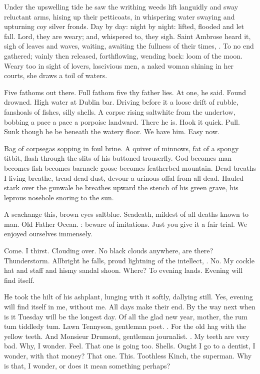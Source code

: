 Under the upswelling tide
he saw the writhing weeds lift languidly
and sway reluctant arms,
hising up their petticoats,
in whispering water swaying and upturning coy silver fronds.
Day by day:
night by night:
lifted, flooded and let fall.
Lord, they are weary;
and, whispered to, they sigh.
Saint Ambrose heard it,
sigh of leaves and waves,
waiting, awaiting the fullness of their times,
.
To no end gathered;
vainly then released, forthflowing,
wending back:
loom of the moon.
Weary too in sight of lovers,
lascivious men,
a naked woman shining in her courts,
she draws a toil of waters.

Five fathoms out there.
Full fathom five thy father lies.
At one, he said.
Found drowned.
High water at Dublin bar.
Driving before it a loose drift of rubble,
fanshoals of fishes, silly shells.
A corpse rising saltwhite from the undertow,
bobbing a pace a pace a porpoise landward.
There he is.
Hook it quick.
Pull.
Sunk though he be beneath the watery floor.
We have him.
Easy now.

Bag of corpsegas sopping in foul brine.
A quiver of minnows,
fat of a spongy titbit,
flash through the slits of his buttoned trouserfly.
God becomes man
becomes fish
becomes barnacle goose
becomes featherbed mountain.
Dead breaths I living breathe,
tread dead dust,
devour a urinous offal from all dead.
Hauled stark over the gunwale
he breathes upward the stench of his green grave,
his leprous nosehole snoring to the sun.

A seachange this, brown eyes saltblue.
Seadeath, mildest of all deaths known to man.
Old Father Ocean.
:
beware of imitations.
Just you give it a fair trial.
We enjoyed ourselves immensely.

Come.
I thirst.
Clouding over.
No black clouds anywhere, are there?
Thunderstorm.
Allbright he falls, proud lightning of the intellect,
.
No.
My cockle hat and staff and hismy sandal shoon.
Where?
To evening lands.
Evening will find itself.

He took the hilt of his ashplant,
lunging with it softly, dallying still.
Yes, evening will find itself in me,
without me.
All days make their end.
By the way next when is it Tuesday
will be the longest day.
Of all the glad new year,
mother, the rum tum tiddledy tum.
Lawn Tennyson, gentleman poet.
.
For the old hag with the yellow teeth.
And Monsieur Drumont,
gentleman journalist.
.
My teeth are very bad.
Why, I wonder.
Feel.
That one is going too.
Shells.
Ought I go to a dentist, I wonder, with that money?
That one.
This.
Toothless Kinch, the superman.
Why is that, I wonder,
or does it mean something perhaps?

